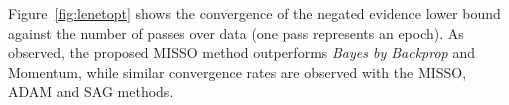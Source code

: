 \documentclass[11pt]{article}
\theoremstyle{t}
\begin{document}
%
%
%



Figure~\ref{fig:lenetopt} shows the convergence of the negated evidence lower bound against the number of passes over data (one pass represents an epoch). As observed, the proposed MISSO method outperforms \textit{Bayes by Backprop} and Momentum, while similar convergence rates are observed with the MISSO, ADAM and SAG methods.
\end{document}
